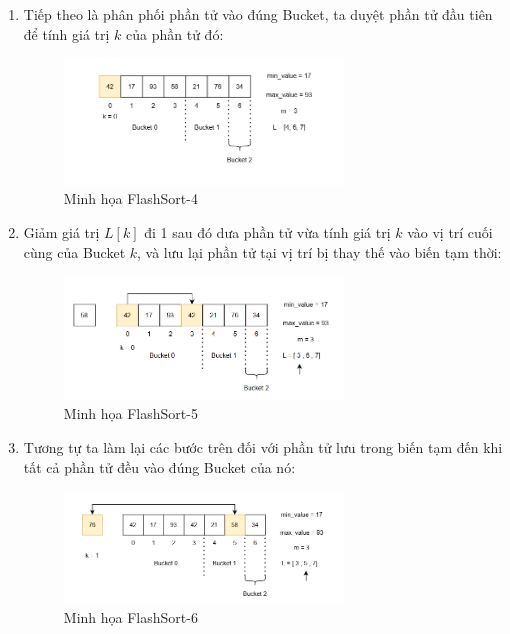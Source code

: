 \begin{enumerate}
    \item Tiếp theo là phân phối phần tử vào đúng Bucket, ta duyệt phần tử đầu tiên để tính giá trị $k$ của phần tử đó:
    \begin{figure}[H]
        \centering
        \includegraphics[width=0.7\textwidth]{img/flash_sort/4.png}
        \caption{Minh họa FlashSort-4}
    \end{figure}
    
    \item Giảm giá trị $L[k]$ đi 1 sau đó dưa phần tử vừa tính giá trị $k$ vào vị trí cuối cùng của Bucket $k$, và lưu lại phần tử tại vị trí bị thay thế vào biến tạm thời:
    \begin{figure}[H]
        \centering
        \includegraphics[width=0.7\textwidth]{img/flash_sort/5.png}
        \caption{Minh họa FlashSort-5}
    \end{figure}
    
    \item Tương tự ta làm lại các bước trên đối với phần tử lưu trong biến tạm đến khi tất cả phần tử đều vào đúng Bucket của nó:
    \begin{figure}[H]
        \centering
        \includegraphics[width=0.7\textwidth]{img/flash_sort/6.png}
        \caption{Minh họa FlashSort-6}
    \end{figure}
    

\end{enumerate}
